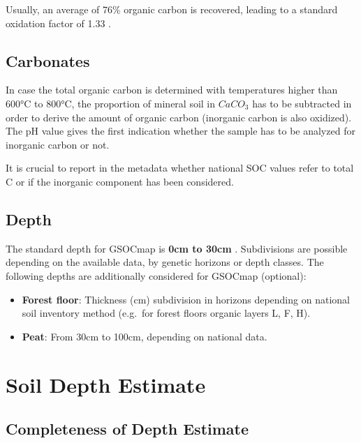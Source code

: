 \documentclass[10pt,b5paper,]{book}
\theoremstyle{definition}
\theoremstyle{definition}
\theoremstyle{definition}
\theoremstyle{remark}
\begin{document}
Usually, an average of 76\% organic carbon is recovered, leading to a
standard oxidation factor of 1.33 \citep{lettens2005soil}.

\hypertarget{carbonates}{%
\subsection{Carbonates}\label{carbonates}}

In case the total organic carbon is determined with temperatures higher
than 600°C to 800°C, the proportion of mineral soil in \(CaCO_3\) has to
be subtracted in order to derive the amount of organic carbon (inorganic
carbon is also oxidized). The pH value gives the first indication
whether the sample has to be analyzed for inorganic carbon or not.

It is crucial to report in the metadata whether national SOC values
refer to total C or if the inorganic component has been considered.

\hypertarget{depth}{%
\subsection{Depth}\label{depth}}

The standard depth for GSOCmap is \textbf{0cm to 30cm}
\citep{gsp_guidelines_2017}. Subdivisions are possible depending on the
available data, by genetic horizons or depth classes. The following
depths are additionally considered for GSOCmap (optional):

\begin{itemize}
\item
  \textbf{Forest floor}: Thickness (cm) subdivision in horizons
  depending on national soil inventory method (e.g.~for forest floors
  organic layers L, F, H).
\item
  \textbf{Peat}: From 30cm to 100cm, depending on national data.
\end{itemize}

\hypertarget{soil-depth-estimate}{%
\section{Soil Depth Estimate}\label{soil-depth-estimate}}

\hypertarget{completeness-of-depth-estimate}{%
\subsection{Completeness of Depth
Estimate}\label{completeness-of-depth-estimate}}
\end{document}

